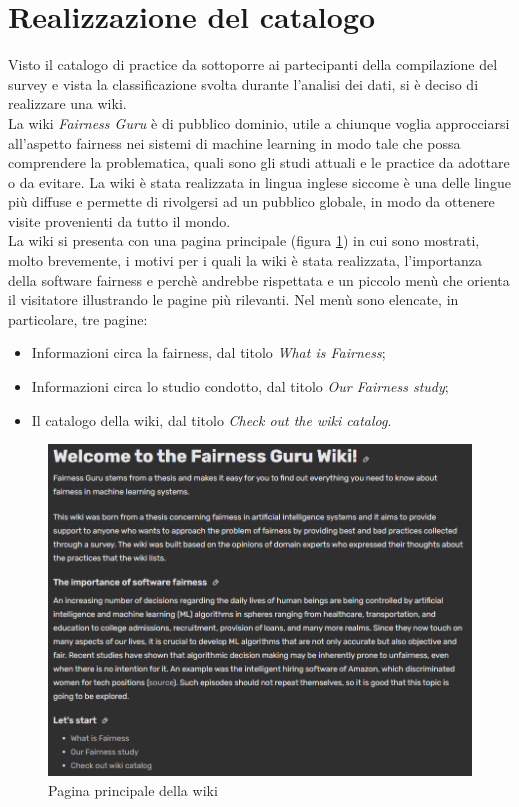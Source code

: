 \section{Realizzazione del catalogo}
Visto il catalogo di practice da sottoporre ai partecipanti della compilazione del survey e vista la classificazione svolta durante l'analisi dei dati, si è deciso di realizzare una wiki.\\
La wiki \emph{Fairness Guru} \cite{wikilink} è di pubblico dominio, utile a chiunque voglia approcciarsi all'aspetto fairness nei sistemi di machine learning in modo tale che possa comprendere la problematica, quali sono gli studi attuali e le practice da adottare o da evitare. La wiki è stata realizzata in lingua inglese siccome è una delle lingue più diffuse e permette di rivolgersi ad un pubblico globale, in modo da ottenere visite provenienti da tutto il mondo.\\
La wiki si presenta con una pagina principale (figura \ref{wiki-welcome}) in cui sono mostrati, molto brevemente, i motivi per i quali la wiki è stata realizzata, l'importanza della software fairness e perchè andrebbe rispettata e un piccolo menù che orienta il visitatore illustrando le pagine più rilevanti. Nel menù sono elencate, in particolare, tre pagine:
\begin{itemize}
    \item Informazioni circa la fairness, dal titolo \emph{What is Fairness};
    \item Informazioni circa lo studio condotto, dal titolo \emph{Our Fairness study};
    \item Il catalogo della wiki, dal titolo \emph{Check out the wiki catalog}.
\end{itemize}

\begin{figure}[h!]
    \centering
    \includegraphics[width=400pt]{figure/catalog/welcome.png}
    \caption{Pagina principale della wiki}
    \label{wiki-welcome}
\end{figure}

